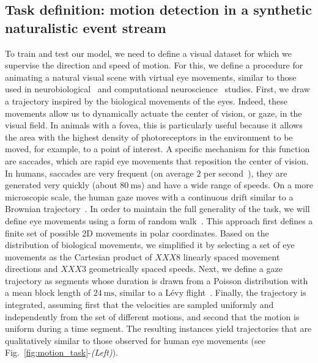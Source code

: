 \documentclass[default]{sn-jnl}%
\theoremstyle{thmstyleone}%
\theoremstyle{thmstyletwo}%
\theoremstyle{thmstylethree}%
\newcommand{\seeFig}[1]{see Fig.~\ref{fig:#1}}%
\newcommand{\ms}{\si{\milli\second}}%
\begin{document}
\subsection{Task definition: motion detection in a synthetic naturalistic event stream}\label{sec:task}
To train and test our model, we need to define a visual dataset for which we supervise the direction and speed of motion. For this, we define a procedure for animating a natural visual scene with virtual eye movements, similar to those used in neurobiological~\citep{vinje_sparse_2000, baudot_animation_2013} and computational neuroscience~\citep{kremkow_push-pull_2016} studies. First, we draw a trajectory inspired by the biological movements of the eyes. Indeed, these movements allow us to dynamically actuate the center of vision, or gaze, in the visual field. In animals with a fovea, this is particularly useful because it allows the area with the highest density of photoreceptors in the environment to be moved, for example, to a point of interest. A specific mechanism for this function are saccades, which are rapid eye movements that reposition the center of vision. In humans, saccades are very frequent (on average $2$ per second~\citep{dandekar_neural_2012}), they are generated very quickly (about $80~\ms$) and have a wide range of speeds. On a more microscopic scale, the human gaze moves with a continuous drift similar to a Brownian trajectory~\citep{poletti_head-eye_2015}. In order to maintain the full generality of the task, we will define eye movements using a form of random walk~\citep{engbert_integrated_2011}. This approach first defines a finite set of possible 2D movements in polar coordinates. Based on the distribution of biological movements, we simplified it by selecting a set of eye movements as the Cartesian product of $XXX8$ linearly spaced movement directions and $XXX3$ geometrically spaced speeds. Next, we define a gaze trajectory as segments whose duration is drawn from a Poisson distribution with a mean block length of $24~\ms$, similar to a Lévy flight~\citep[p. 289]{mandelbrot_fractal_1982}. Finally, the trajectory is integrated, assuming first that the velocities are sampled uniformly and independently from the set of different motions, and second that the motion is uniform during a time segment. The resulting instances yield trajectories that are qualitatively similar to those observed for human eye movements (\seeFig{motion_task}-\textit{(Left)}).
\end{document}
